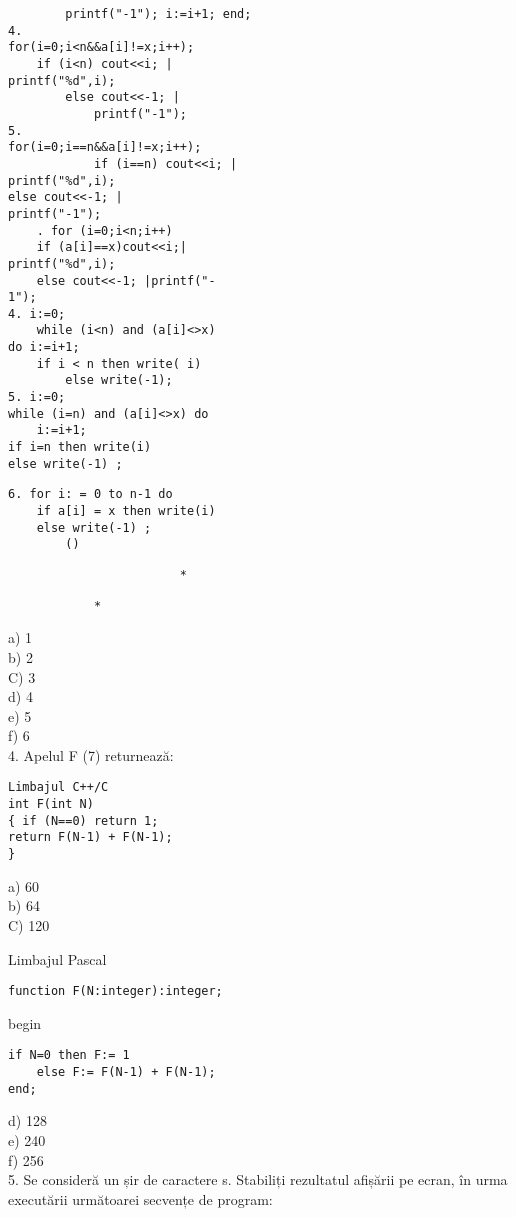 \begin{verbatim}
        printf("-1"); i:=i+1; end;
4.
for(i=0;i<n&&a[i]!=x;i++);
    if (i<n) cout<<i; |
printf("%d",i);
        else cout<<-1; |
            printf("-1");
5.
for(i=0;i==n&&a[i]!=x;i++);
            if (i==n) cout<<i; |
printf("%d",i);
else cout<<-1; |
printf("-1");
    . for (i=0;i<n;i++)
    if (a[i]==x)cout<<i;|
printf("%d",i);
    else cout<<-1; |printf("-
1");
4. i:=0;
    while (i<n) and (a[i]<>x)
do i:=i+1;
    if i < n then write( i)
        else write(-1);
5. i:=0;
while (i=n) and (a[i]<>x) do
    i:=i+1;
if i=n then write(i)
else write(-1) ;
\end{verbatim}

\begin{verbatim}
6. for i: = 0 to n-1 do
    if a[i] = x then write(i)
    else write(-1) ;
        ()
\end{verbatim}

\begin{verbatim}
                        *
\end{verbatim}

\begin{verbatim}
            *
\end{verbatim}

a) 1\\
b) 2\\
C) 3\\
d) 4\\
e) 5\\
f) 6\\
4. Apelul F (7) returnează:

\begin{verbatim}
Limbajul C++/C
int F(int N)
{ if (N==0) return 1;
return F(N-1) + F(N-1);
}
\end{verbatim}

a) 60\\
b) 64\\
C) 120

Limbajul Pascal

\begin{verbatim}
function F(N:integer):integer;
\end{verbatim}

begin

\begin{verbatim}
if N=0 then F:= 1
    else F:= F(N-1) + F(N-1);
end;
\end{verbatim}

d) 128\\
e) 240\\
f) 256\\
5. Se consideră un șir de caractere s. Stabiliți rezultatul afișării pe ecran, în urma executării următoarei secvențe de program:

